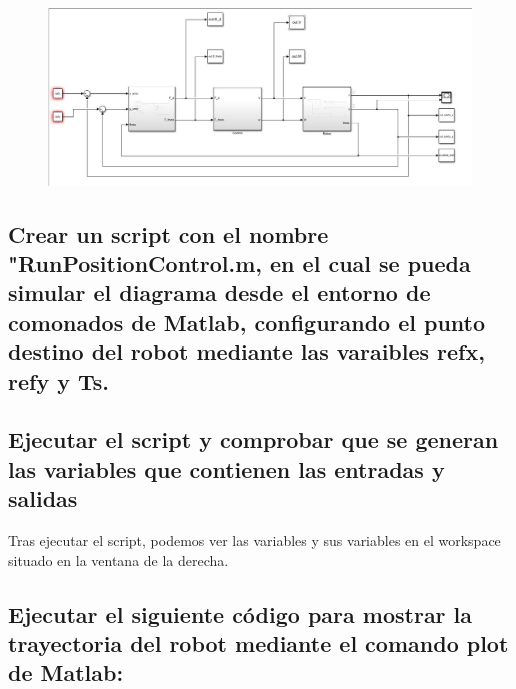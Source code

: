 \documentclass[12pt]{article}
\begin{document}
\begin{figure}[!htb]
    \centering
    \includegraphics[scale=0.25]{PositionControl.JPG}
\end{figure}


\mbox{}

\subsection{Crear un script con el nombre "RunPositionControl.m, en el cual se pueda simular el diagrama desde el entorno de comonados de Matlab, configurando el punto destino del robot mediante las varaibles refx, refy y Ts.}



\subsection{Ejecutar el script y comprobar que se generan las variables que contienen las entradas y salidas}

Tras ejecutar el script, podemos ver las variables y sus variables en el workspace situado en la ventana de la derecha.

\subsection{Ejecutar el siguiente código para mostrar la trayectoria del robot mediante el comando plot de Matlab: }


\end{document}
